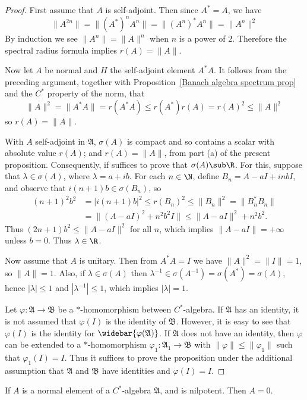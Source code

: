 \begin{proof}
First assume that $A$ is self-adjoint. Then since $A^*=A$, we have
\[\|A^{2n}\|=\|(A^*)^nA^n\|=\|(A^n)^*A^n\|=\|A^n\|^2\]
By induction we see $\|A^n\|=\|A\|^n$ when $n$ is a power of $2$. Therefore the spectral radius formula implies $r(A)=\|A\|$.\par
Now let $A$ be normal and $H$ the self-adjoint element $A^*A$. It follows from the preceding argument, together with Proposition~\ref{Banach algebra spectrum prop} and the $C^*$ property of the norm, that
\[\|A\|^2=\|A^*A\|=r(A^*A)\leq r(A^*)r(A)=r(A)^2\leq\|A\|^2\]
so $r(A)=\|A\|$.\par
With $A$ self-adjoint in $\mathfrak{A}$, $\sigma(A)$ is compact and so contains a scalar with absolute value $r(A)$; and $r(A)=\|A\|$, from part (a) of the present proposition. Consequently, if suffices to prove that $\sigma(A)\sub\R$. For this, suppose that $\lambda\in\sigma(A)$, where $\lambda=a+ib$. For each $n\in\N$, define $B_n=A-aI+inbI$, and observe that $i(n+1)b\in\sigma(B_n)$, so 
\begin{align*}
(n+1)^2b^2&=|i(n+1)b|^2\leq r(B_n)^2\leq\|B_n\|^2=\|B_n^*B_n\|\\
&=\|(A-aI)^2+n^2b^2I\|\leq\|A-aI\|^2+n^2b^2.
\end{align*}
Thus $(2n+1)b^2\leq\|A-aI\|^2$ for all $n$, which implies $\|A-aI\|=+\infty$ unless $b=0$. Thus $\lambda\in\R$.\par
Now assume that $A$ is unitary. Then from $A^*A=I$ we have $\|A\|^2=\|I\|=1$, so $\|A\|=1$. Also, if $\lambda\in\sigma(A)$ then $\lambda^{-1}\in\sigma(A^{-1})=\sigma(A^*)=\sigma(A)$, hence $|\lambda|\leq 1$ and $|\lambda^{-1}|\leq 1$, which implies $|\lambda|=1$.\par
Let $\varphi:\mathfrak{A}\to\mathfrak{B}$ be a $*$-homomorphism between $C^*$-algebra. If $\mathfrak{A}$ has an identity, it is not assumed that $\varphi(I)$ is the identity of $\mathfrak{B}$. However, it is easy to see that $\varphi(I)$ is the identity for $\widebar{\varphi(\mathfrak{A})}$. If $\mathfrak{A}$ does not have an identity, then $\varphi$ can be extended to a $*$-homomorphism $\varphi_1:\mathfrak{A}_1\to\mathfrak{B}$ with $\|\varphi\|\leq\|\varphi_1\|$ such that $\varphi_1(I)=I$. Thus it suffices to prove the proposition under the additional assumption that $\mathfrak{A}$ and $\mathfrak{B}$ have identities and $\varphi(I)=I$.
\end{proof}
\begin{corollary}\label{C^* algebra normal nilpotent is zero}
If $A$ is a normal element of a $C^*$-algebra $\mathfrak{A}$, and is nilpotent. Then $A=0$.
\end{corollary}
